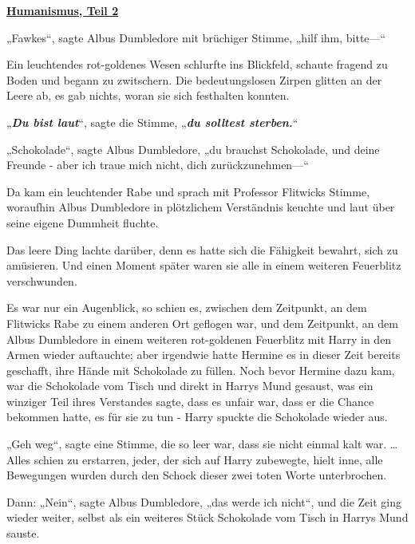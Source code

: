

\hypertarget{humanismus-teil-2}{%

\textbf{\uline{Humanismus, Teil 2}}

„Fawkes“, sagte Albus Dumbledore mit brüchiger Stimme, „hilf ihm, bitte—“

Ein leuchtendes rot-goldenes Wesen schlurfte ins Blickfeld, schaute fragend zu Boden und begann zu zwitschern. Die bedeutungslosen Zirpen glitten an der Leere ab, es gab nichts, woran sie sich festhalten konnten.

„\textbf{\emph{Du bist laut}}“, sagte die Stimme, „\textbf{\emph{du solltest sterben.}}“

„Schokolade“, sagte Albus Dumbledore, „du brauchst Schokolade, und deine Freunde - aber ich traue mich nicht, dich zurückzunehmen—“

Da kam ein leuchtender Rabe und sprach mit Professor Flitwicks Stimme, woraufhin Albus Dumbledore in plötzlichem Verständnis keuchte und laut über seine eigene Dummheit fluchte.

Das leere Ding lachte darüber, denn es hatte sich die Fähigkeit bewahrt, sich zu amüsieren. Und einen Moment später waren sie alle in einem weiteren Feuerblitz verschwunden.

Es war nur ein Augenblick, so schien es, zwischen dem Zeitpunkt, an dem Flitwicks Rabe zu einem anderen Ort geflogen war, und dem Zeitpunkt, an dem Albus Dumbledore in einem weiteren rot-goldenen Feuerblitz mit Harry in den Armen wieder auftauchte; aber irgendwie hatte Hermine es in dieser Zeit bereits geschafft, ihre Hände mit Schokolade zu füllen. Noch bevor Hermine dazu kam, war die Schokolade vom Tisch und direkt in Harrys Mund gesaust, was ein winziger Teil ihres Verstandes sagte, dass es unfair war, dass er die Chance bekommen hatte, es für sie zu tun - Harry spuckte die Schokolade wieder aus.

„Geh weg“, sagte eine Stimme, die so leer war, dass sie nicht einmal kalt war. …Alles schien zu erstarren, jeder, der sich auf Harry zubewegte, hielt inne, alle Bewegungen wurden durch den Schock dieser zwei toten Worte unterbrochen.

Dann: „Nein“, sagte Albus Dumbledore, „das werde ich nicht“, und die Zeit ging wieder weiter, selbst als ein weiteres Stück Schokolade vom Tisch in Harrys Mund sauste.

}
